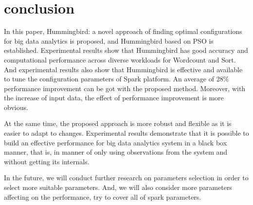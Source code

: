 \section{conclusion}\label{sec:conclusion}
\par In this paper, Hummingbird: a novel approach of finding optimal configurations for big data analytics is proposed, and Hummingbird  based on PSO  is established.  Experimental results show that Hummingbird has good accuracy and computational performance across diverse workloads for Wordcount and Sort. And experimental results also show that Hummingbird is effective and available to tune the configuration parameters of Spark platform. An average of 28\% performance improvement can be got with the proposed method. Moreover, with the increase of input data, the effect of performance improvement is more obvious.
\par At the same time, the proposed approach is more robust and flexible as it is easier to adapt to changes. Experimental results demonstrate that it is possible to build an effective performance for big data analytics system in a black box manner, that is, in manner of only using observations from the system and without getting its internals.
\par In the future, we will conduct further research on parameters selection in order to select more suitable parameters. And, we will also consider more parameters affecting on the performance,  try to cover all of spark parameters.
